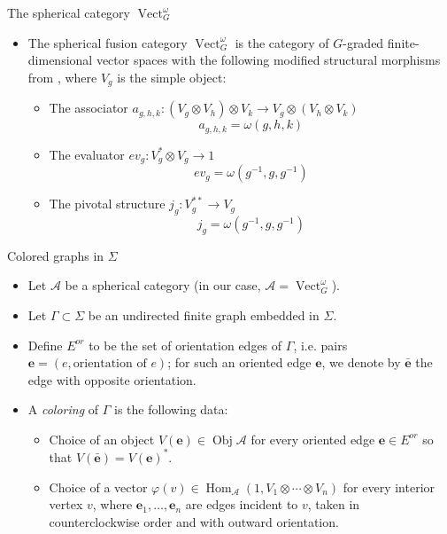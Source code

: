 \documentclass{beamer}
\newcommand{\ph}{\varphi}
\newcommand{\ee}{\mathbf{e}}
\DeclareMathOperator{\Obj}{Obj}
\DeclareMathOperator{\Hom}{Hom}
\DeclareMathOperator{\Vect}{Vect}
\begin{document}
\begin{frame}{The spherical category $\Vect^\omega_G$}
\begin{itemize}
\item  The spherical fusion category $\Vect^\omega_G$ is the category of $G$-graded finite-dimensional vector spaces with the following
modified structural morphisms from \cite{math/0601012}, where $V_g$ is the simple object:   
\begin{itemize} 
\item The associator $a_{g,h,k}:(V_g \otimes V_h) \otimes V_k \to V_g \otimes (V_h \otimes V_k)$
            $$ a_{g,h,k} = \omega(g,h,k)$$
\item The evaluator $ev_g:V_g^* \otimes V_g \to 1$
            $$ ev_g = \omega(g^{-1},g,g^{-1})$$
\item The pivotal structure $j_g:V_g^{**} \to V_g$
            $$ j_g = \omega(g^{-1},g,g^{-1})$$
\end{itemize}
\end{itemize}
\end{frame}

\begin{frame}{Colored graphs in $\Sigma$}
\begin{itemize}
\item Let $\mathcal A$ be a spherical category (in our case, $\mathcal A = \Vect^\omega_G$).

\item Let $\Gamma \subset \Sigma$ be an undirected finite graph embedded in $\Sigma$.

\pause \item Define $E^{or}$ to be the set of orientation edges of $\Gamma$, i.e. pairs $\ee=(e,
\text{orientation of } e)$; for such an oriented edge $\ee$, we denote by $\bar{\ee}$ the edge with opposite orientation. 

\pause \item A {\em coloring} of $\Gamma$ is the
following data: 
\begin{itemize}
    \item Choice of an object $V(\ee)\in \Obj \mathcal A$ for every oriented edge  $\ee \in E^{or}$ so that $V(\bar{\ee})=V(\ee)^*$.
    \pause \item Choice of a vector $\ph(v)\in \Hom_{\mathcal A}(1, V_1 \otimes \cdots \otimes V_n)$  for  every interior vertex $v$, where 
      $\ee_1, \dots, \ee_n$ are edges incident to $v$, taken in counterclockwise 
      order and with outward orientation.
\end{itemize}
\end{itemize}
\end{frame}
\end{document}
